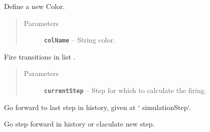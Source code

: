 \documentclass[a4paper,10pt,english]{sphinxmanual}
\begin{document}
\begin{fulllineitems}
\begin{fulllineitems}
\end{fulllineitems}


\begin{fulllineitems}
\label{model_link:model.CPNSimulator.CPNSimulator.defineNewColour}
Define a new Color.
\begin{quote}\begin{description}
\item[{Parameters}] \leavevmode
\textbf{\texttt{colName}} -- String color.

\end{description}\end{quote}

\end{fulllineitems}


\begin{fulllineitems}
\label{model_link:model.CPNSimulator.CPNSimulator.fireEnabledTransitions}
Fire transitions in list .
\begin{quote}\begin{description}
\item[{Parameters}] \leavevmode
\textbf{\texttt{currentStep}} -- Step for which to calculate the firing.

\end{description}\end{quote}

\end{fulllineitems}


\begin{fulllineitems}
\label{model_link:model.CPNSimulator.CPNSimulator.forward2lastStep}
Go forward to last step in history, given at {}` simulationStep{}`.

\end{fulllineitems}


\begin{fulllineitems}
\label{model_link:model.CPNSimulator.CPNSimulator.forwardStep}
Go step forward in history or claculate new step.


\end{fulllineitems}
\end{fulllineitems}
\end{document}
